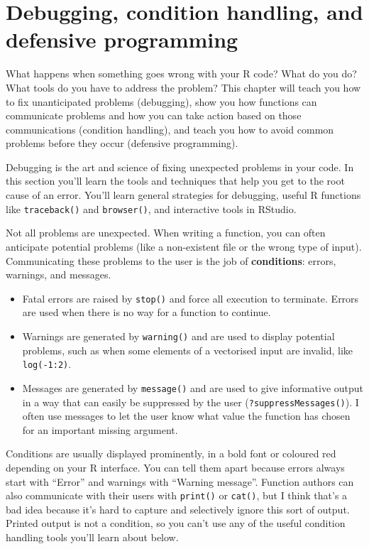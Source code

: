 \chapter{Debugging, condition handling, and defensive
programming}\label{debugging}

What happens when something goes wrong with your R code? What do you do?
What tools do you have to address the problem? This chapter will teach
you how to fix unanticipated problems (debugging), show you how
functions can communicate problems and how you can take action based on
those communications (condition handling), and teach you how to avoid
common problems before they occur (defensive programming).

Debugging is the art and science of fixing unexpected problems in your
code. In this section you'll learn the tools and techniques that help
you get to the root cause of an error. You'll learn general strategies
for debugging, useful R functions like \texttt{traceback()} and
\texttt{browser()}, and interactive tools in RStudio.

Not all problems are unexpected. When writing a function, you can often
anticipate potential problems (like a non-existent file or the wrong
type of input). Communicating these problems to the user is the job of
\textbf{conditions}: errors, warnings, and messages.

\begin{itemize}
\item
  Fatal errors are raised by \texttt{stop()} and force all execution to
  terminate. Errors are used when there is no way for a function to
  continue.  
\item
  Warnings are generated by \texttt{warning()} and are used to display
  potential problems, such as when some elements of a vectorised input
  are invalid, like \texttt{log(-1:2)}.
\item
  Messages are generated by \texttt{message()} and are used to give
  informative output in a way that can easily be suppressed by the user
  (\texttt{?suppressMessages()}). I often use messages to let the user
  know what value the function has chosen for an important missing
  argument.
\end{itemize}

Conditions are usually displayed prominently, in a bold font or coloured
red depending on your R interface. You can tell them apart because
errors always start with ``Error'' and warnings with ``Warning
message''. Function authors can also communicate with their users with
\texttt{print()} or \texttt{cat()}, but I think that's a bad idea
because it's hard to capture and selectively ignore this sort of output.
Printed output is not a condition, so you can't use any of the useful
condition handling tools you'll learn about below.


